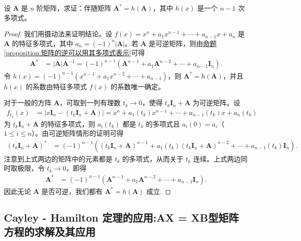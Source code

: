 \documentclass[../../main.tex]{subfiles}
\begin{document}
\begin{proposition}\label{proposition:伴随矩阵可原矩阵的多项式表示}
设 \(\boldsymbol{A}\) 是 \(n\) 阶矩阵，求证：伴随矩阵 \(\boldsymbol{A}^* = h(\boldsymbol{A})\)，其中 \(h(x)\) 是一个 \(n - 1\) 次多项式。
\end{proposition}
\begin{proof}
我们用摄动法来证明结论。设 \(f(x)=x^n + a_1x^{n - 1}+\cdots + a_{n - 1}x + a_n\) 是 \(\boldsymbol{A}\) 的特征多项式，其中 \(a_n = (-1)^n|\boldsymbol{A}|\)。若 \(\boldsymbol{A}\) 是可逆矩阵，则由\hyperref[proposition:矩阵的逆可以用其多项式表示]{命题\ref{proposition:矩阵的逆可以用其多项式表示}}可得
\begin{align*}
\boldsymbol{A}^*&=|\boldsymbol{A}|\boldsymbol{A}^{-1}=(-1)^{n - 1}(\boldsymbol{A}^{n - 1}+a_1\boldsymbol{A}^{n - 2}+\cdots + a_{n - 1}\boldsymbol{I}_n).
\end{align*}
令 \(h(x)=(-1)^{n - 1}(x^{n - 1}+a_1x^{n - 2}+\cdots + a_{n - 1})\)，则 \(\boldsymbol{A}^* = h(\boldsymbol{A})\)，并且 \(h(x)\) 的系数由特征多项式 \(f(x)\) 的系数唯一确定。

对于一般的方阵 \(\boldsymbol{A}\)，可取到一列有理数 \(t_k\rightarrow 0\)，使得 \(t_k\boldsymbol{I}_n+\boldsymbol{A}\) 为可逆矩阵。设
\begin{align*}
f_{t_k}(x)&=|x\boldsymbol{I}_n-(t_k\boldsymbol{I}_n+\boldsymbol{A})|=x^n + a_1(t_k)x^{n - 1}+\cdots + a_{n - 1}(t_k)x + a_n(t_k)
\end{align*}
为 \(t_k\boldsymbol{I}_n+\boldsymbol{A}\) 的特征多项式，则 \(a_i(t_k)\) 都是 \(t_k\) 的多项式且 \(a_i(0)=a_i\)（\(1\leq i\leq n\)）。由可逆矩阵情形的证明可得
\begin{align*}
(t_k\boldsymbol{I}_n+\boldsymbol{A})^*&=(-1)^{n - 1}\left((t_k\boldsymbol{I}_n+\boldsymbol{A})^{n - 1}+a_1(t_k)(t_k\boldsymbol{I}_n+\boldsymbol{A})^{n - 2}+\cdots + a_{n - 1}(t_k)\boldsymbol{I}_n\right).
\end{align*}
注意到上式两边的矩阵中的元素都是 \(t_k\) 的多项式，从而关于 \(t_k\) 连续。上式两边同时取极限，令 \(t_k\rightarrow 0\)，即得
\begin{align*}
\boldsymbol{A}^*&=(-1)^{n - 1}(\boldsymbol{A}^{n - 1}+a_1\boldsymbol{A}^{n - 2}+\cdots + a_{n - 1}\boldsymbol{I}_n).
\end{align*}
因此无论 \(\boldsymbol{A}\) 是否可逆，我们都有 \(\boldsymbol{A}^* = h(\boldsymbol{A})\) 成立.
\end{proof}

\subsection{Cayley - Hamilton 定理的应用:AX = XB型矩阵方程的求解及其应用}
\end{document}
